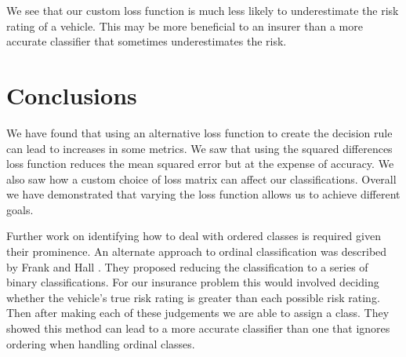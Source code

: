 We see that our custom loss function is much less likely to underestimate the risk rating of a vehicle.
This may be more beneficial to an insurer than a more accurate classifier that sometimes underestimates the risk.

\section{Conclusions}

We have found that using an alternative loss function to create the decision rule can lead to increases in some metrics.
We saw that using the squared differences loss function reduces the mean squared error but at the expense of accuracy.
We also saw how a custom choice of loss matrix can affect our classifications.
Overall we have demonstrated that varying the loss function allows us to achieve different goals.

Further work on identifying how to deal with ordered classes is required given their prominence.
An alternate approach to ordinal classification was described by Frank and Hall \cite{Frank01}.
They proposed reducing the classification to a series of binary classifications.
For our insurance problem this would involved deciding whether the vehicle's true risk rating is greater than each possible risk rating.
Then after making each of these judgements we are able to assign a class.
They showed this method can lead to a more accurate classifier than one that ignores ordering when handling ordinal classes.